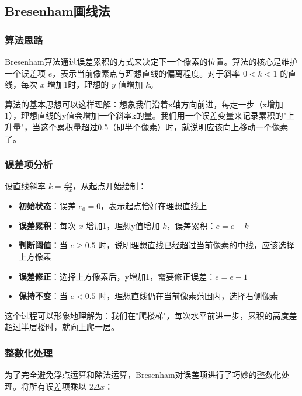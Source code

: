 \documentclass[12pt,a4paper]{article}
\begin{document}
\subsection{Bresenham画线法}

\begin{tcolorbox}

\subsubsection*{算法思路}

Bresenham算法通过误差累积的方式来决定下一个像素的位置。算法的核心是维护一个误差项 $e$，表示当前像素点与理想直线的偏离程度。对于斜率 $0 < k < 1$ 的直线，每次 $x$ 增加1时，理想的 $y$ 值增加 $k$。

算法的基本思想可以这样理解：想象我们沿着x轴方向前进，每走一步（x增加1），理想直线的y值会增加一个斜率k的量。我们用一个误差变量来记录累积的"上升量"，当这个累积量超过0.5（即半个像素）时，就说明应该向上移动一个像素了。

\subsubsection*{误差项分析}

设直线斜率 $k = \frac{\Delta y}{\Delta x}$，从起点开始绘制：
\begin{itemize}
    \item \textbf{初始状态}：误差 $e_0 = 0$，表示起点恰好在理想直线上
    \item \textbf{误差累积}：每次 $x$ 增加1，理想y值增加 $k$，误差累积：$e = e + k$
    \item \textbf{判断阈值}：当 $e \geq 0.5$ 时，说明理想直线已经超过当前像素的中线，应该选择上方像素
    \item \textbf{误差修正}：选择上方像素后，y增加1，需要修正误差：$e = e - 1$
    \item \textbf{保持不变}：当 $e < 0.5$ 时，理想直线仍在当前像素范围内，选择右侧像素
\end{itemize}

这个过程可以形象地理解为：我们在"爬楼梯"，每次水平前进一步，累积的高度差超过半层楼时，就向上爬一层。

\subsubsection*{整数化处理}

为了完全避免浮点运算和除法运算，Bresenham对误差项进行了巧妙的整数化处理。将所有误差项乘以 $2\Delta x$：


\end{tcolorbox}
\end{document}
